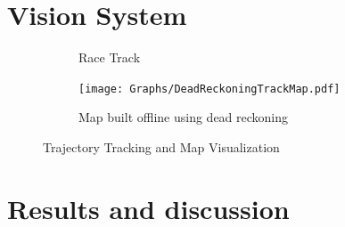     \section{Vision System}
    \begin{figure}[H]
        \centering
        \begin{subfigure}[c]{0.35\textwidth}  %
            \centering
            \caption{Race Track}
        \end{subfigure}
        \hspace{0.05cm}  %
        \begin{subfigure}[c]{0.6\textwidth}  %
            \centering
            \texttt{[image: Graphs/DeadReckoningTrackMap.pdf]}
            \caption{Map built offline using dead reckoning}
        \end{subfigure}
        \caption{Trajectory Tracking and Map Visualization}
    \end{figure}
    
    
    \pagebreak{}


  \section{Results and discussion} %
